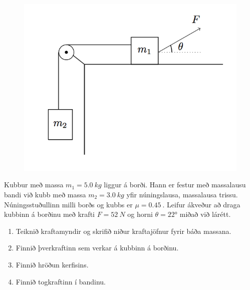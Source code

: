 \begin{enumerate}[label = \textbf{Dæmi \thechapter.\arabic*.}]
\begin{minipage}{\linewidth}
\begin{figure}
\includegraphics[width=1.8 in]{images/krafta.png}
\end{figure}

\item Kubbur með massa $m_1 = \SI{5.0}{kg}$ liggur á borði. Hann er festur með massalausu bandi við kubb með massa $m_2 = \SI{3.0}{kg}$ yfir núningslausa, massalausa trissu. Núningsstuðullinn milli borðs og kubbs er $\mu = \SI{0.45}{}$. Leifur ákveður að draga kubbinn á borðinu með krafti $F = \SI{52}{N}$ og horni $\theta = \ang{22}$ miðað við lárétt.

\end{minipage}

\begin{enumerate}[label = \textbf{(\alph*)}]
    \item Teiknið kraftamyndir og skrifið niður kraftajöfnur fyrir báða massana.
    
    \item Finnið þverkraftinn sem verkar á kubbinn á borðinu.
    
    \item Finnið hröðun kerfisins.
    
    \item Finnið togkraftinn í bandinu.
\end{enumerate}

\end{enumerate}
